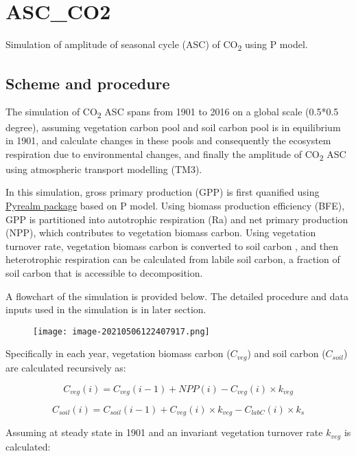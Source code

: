 \documentclass[
]{article}
\author{}
\date{}
\begin{document}
\hypertarget{ascco2}{%
\section{ASC\_CO2}\label{ascco2}}

Simulation of amplitude of seasonal cycle (ASC) of CO\textsubscript{2}
using P model.

\hypertarget{scheme-and-procedure}{%
\subsection{Scheme and procedure}\label{scheme-and-procedure}}

The simulation of CO\textsubscript{2} ASC spans from 1901 to 2016 on a
global scale (0.5*0.5 degree), assuming vegetation carbon pool and soil
carbon pool is in equilibrium in 1901, and calculate changes in these
pools and consequently the ecosystem respiration due to environmental
changes, and finally the amplitude of CO\textsubscript{2} ASC using
atmospheric transport modelling (TM3).

In this simulation, gross primary production (GPP) is first quanified
using \href{https://github.com/davidorme/pyrealm/tree/master}{Pyrealm
package} based on P model. Using biomass production efficiency (BFE),
GPP is partitioned into autotrophic respiration (Ra) and net primary
production (NPP), which contributes to vegetation biomass carbon. Using
vegetation turnover rate, vegetation biomass carbon is converted to soil
carbon , and then heterotrophic respiration can be calculated from
labile soil carbon, a fraction of soil carbon that is accessible to
decomposition.

A flowchart of the simulation is provided below. The detailed procedure
and data inputs used in the simulation is in later section.

\begin{figure}
\centering
\texttt{[image: image-20210506122407917.png]}
\caption{}
\end{figure}

Specifically in each year, vegetation biomass carbon (\(C_{veg}\)) and
soil carbon (\(C_{soil}\)) are calculated recursively as:

\[C_{veg}(i) = C_{veg}(i-1)+NPP(i)-C_{veg}(i) \times k_{veg}\]

\[C_{soil}(i) = C_{soil}(i-1)+C_{veg}(i) \times k_{veg}-C_{labC}(i)\times k_{s}\]

Assuming at steady state in 1901 and an invariant vegetation turnover
rate \(k_{veg}\) is calculated:
\end{document}
